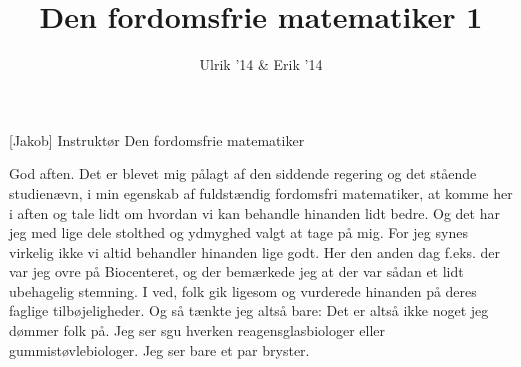 \documentclass[a4paper,11pt]{article}
\title{Den fordomsfrie matematiker 1}
\author{Ulrik '14 \& Erik '14}
\begin{document}
\maketitle

\begin{roles}
[Jakob] Instruktør
 Den fordomsfrie matematiker
\end{roles}




\begin{sketch}


 God aften. Det er blevet mig pålagt af den siddende regering og det stående studienævn, i min egenskab af fuldstændig fordomsfri matematiker, at komme her i aften og tale lidt om hvordan vi kan behandle hinanden lidt bedre. Og det har jeg med lige dele stolthed og ydmyghed valgt at tage på mig. For jeg synes virkelig ikke vi altid behandler hinanden lige godt. Her den anden dag f.eks. der var jeg ovre på Biocenteret, og der bemærkede jeg at der var sådan et lidt ubehagelig stemning. I ved, folk gik ligesom og vurderede hinanden på deres faglige tilbøjeligheder. Og så tænkte jeg altså bare: Det er altså ikke noget jeg dømmer folk på. Jeg ser sgu hverken reagensglasbiologer eller gummistøvlebiologer. Jeg ser bare et par bryster.


\end{sketch}
\end{document}
